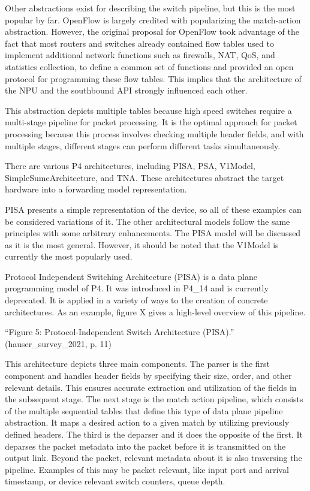 Other abstractions exist for describing the switch pipeline, but this is the most popular by far. OpenFlow is largely credited with popularizing the match-action abstraction\cite{bifulco_survey_2018}. However, the original proposal for OpenFlow took advantage of the fact that most routers and switches already contained flow tables used to implement additional network functions such as firewalls, NAT, QoS, and statistics collection, to define a common set of functions and provided an open protocol for programming these flow tables\cite{mckeown_openflow_2008}. This implies that the architecture of the NPU and the southbound API strongly influenced each other.

This abstraction depicts multiple tables because high speed switches require a multi-stage pipeline for packet processing. It is the optimal approach for packet processing because this process involves checking multiple header fields, and with multiple stages, different stages can perform different tasks simultaneously. \cite{peterson_software-defined_2021}

There are various P4 architectures, including PISA, PSA, V1Model, SimpleSumeArchitecture, and TNA\cite{peterson_software-defined_2021}\cite{hauser_survey_2021}. These architectures abstract the target hardware into a forwarding model representation. 

PISA presents a simple representation of the device, so all of these examples can be considered variations of it. The other architectural models follow the same principles with some arbitrary enhancements. The PISA model will be discussed as it is the most general. However, it should be noted that the V1Model is currently the most popularly used.

Protocol Independent Switching Architecture (PISA) is a data plane programming model of P4. It was introduced in P4_14 and is currently deprecated. It is applied in a variety of ways to the creation of concrete architectures\cite{hauser_survey_2021}. As an example, figure X gives a high-level overview of this pipeline. 

“Figure 5: Protocol-Independent Switch Architecture (PISA).” (hauser_survey_2021, p. 11)

This architecture depicts three main components. The parser is the first component and handles header fields by specifying their size, order, and other relevant details. This ensures accurate extraction and utilization of the fields in the subsequent stage. The next stage is the match action pipeline, which consists of the multiple sequential tables that define this type of data plane pipeline abstraction. It maps a desired action to a given match by utilizing previously defined headers. The third is the deparser and it does the opposite of the first. It deparses the packet metadata into the packet before it is transmitted on the output link. Beyond the packet, relevant metadata about it is also traversing the pipeline. Examples of this may be packet relevant, like input port and arrival timestamp, or device relevant switch counters, queue depth. \cite{peterson_software-defined_2021}

